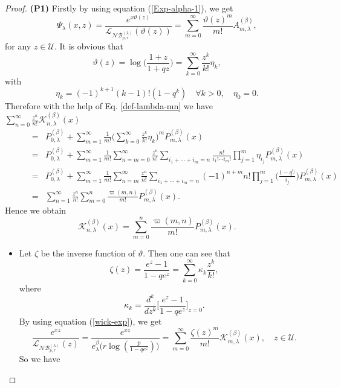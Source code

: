 \documentclass[10pt,a4paper]{amsart}
\begin{document}
\begin{proof}
\textbf{(P1)}
Firstly by using equation (\ref{Exp-alpha-1}), we get
$$\Psi_{\lambda}(x, z)=\displaystyle{\frac{e^{x\vartheta(z)}}{\mathcal{L}_{\mathcal{NB}^{(\lambda)}_{p, r}}(\vartheta(z))}
=\sum^{\infty}_{m=0}\frac{\vartheta(z)^{m}}{m!}A^{(\beta)}_{m,
\lambda}},$$ for any $z\in \mathcal{U}$. It is obvious that
$$\vartheta(z)=\log\Big(\frac{1+z}{1+qz}\Big)=\displaystyle{\sum^{\infty}_{k=0}\frac{z^{k}}{k!}\eta_{k}},$$
with
$$
\eta_{k}=\displaystyle{(-1)^{k+1}(k-1)!(1-q^{k}) \quad\forall
k>0,\quad \eta_{0}=0}.
$$
Therefore with the help of Eq. \eqref{def-lambda-mn} we have\\

$\displaystyle{\sum^{\infty}_{n=0}\frac{z^{n}}{n!}\mathcal{K}^{(\beta)}_{n,
\lambda}(x)}$
$$\begin{array}{lll}
\qquad&=&P^{(\beta)}_{0,
\lambda}+\displaystyle{\sum^{\infty}_{m=1}\frac{1}{m!}\Big(\sum^{\infty}_{k=0}
\frac{z^{k}}{k!}\eta_{k}\Big)^{m}P^{(\beta)}_{m, \lambda}(x)}\\
&=&P^{(\beta)}_{0,
\lambda}+\displaystyle{\sum^{\infty}_{m=1}\frac{1}{m!}\sum^{\infty}_{n=m=0}\frac{z^{n}}{n!}
\sum_{i_{1}+\cdots+i_{m}=n}\frac{n!}{i_{1}!\cdots i_{m}!}\prod^{m}_{j=1}\eta_{i_{j}}P^{(\beta)}_{m, \lambda}(x)}\\
&=&P^{(\beta)}_{0,
\lambda}+\displaystyle{\sum^{\infty}_{m=1}\frac{1}{m!}\sum^{\infty}_{n=m}\frac{z^{n}}{n!}
\sum_{i_{1}+\cdots+i_{m}=n}(-1)^{n+m}n!\prod^{m}_{j=1}\Big(\frac{1-q^{i_{j}}}{i_{j}}\Big)P^{(\beta)}_{m, \lambda}(x)}\\
&=&\displaystyle{\sum^{\infty}_{n=1}\frac{z^{n}}{n!}\sum^{n}_{m=0}\frac{\varpi(m,
n)}{m!}P^{(\beta)}_{m, \lambda}(x)}.
\end{array}$$
Hence we obtain
$$\displaystyle{\mathcal{K}^{(\beta)}_{n, \lambda}(x)=\displaystyle{\sum^{n}_{m=0}
\frac{\varpi(m, n)}{m!}P^{(\beta)}_{m, \lambda}(x)}}.$$
\begin{itemize}
\item [\textbf{(P2)}]
Let $\zeta$ be the inverse function of $\vartheta$. Then one can see
that
$$\zeta(z)=\displaystyle{\frac{e^{z}-1}{1-qe^{z}}=\sum^{\infty}_{k=0}\kappa_{k}\frac{z^{k}}{k!},}$$
where
$$\kappa_{k}=\displaystyle{\frac{d^{k}}{dz^{k}}\Big[\frac{e^{z}-1}{1-qe^{z}}\Big]_{z=0}}.$$
By using equation (\ref{wick-exp}), we get
$$\displaystyle{\frac{e^{xz}}{\mathcal{L}_{\mathcal{NB}^{(\lambda)}_{p, r}}(z)}=
\frac{e^{xz}}{e^{\beta}_{\lambda}\Big(r\log(\frac{p}{1-qe^{z}})\Big)}=
\sum^{\infty}_{m=0}\frac{\zeta(z)^{m}}{m!}\mathcal{K}^{(\beta)}_{m,
\lambda}(x)},\quad z\in \mathcal{U}.$$
So we have\\


\end{itemize}
\end{proof}
\end{document}
